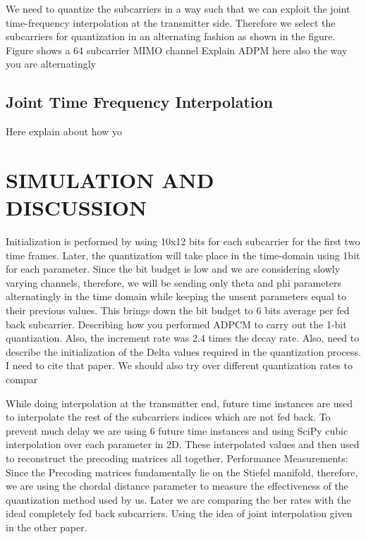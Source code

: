 \documentclass[conference]{IEEEtran}
\begin{document}
We need to quantize the subcarriers in a way such that we can exploit the joint time-frequency interpolation at the transmitter side. Therefore we select the subcarriers for quantization in an alternating fashion as shown in the figure. Figure shows a 64 subcarrier MIMO channel
Explain ADPM here
also the way you are alternatingly
\subsection{Joint Time Frequency Interpolation}
\label{interp}

Here explain about how yo
\section{SIMULATION AND DISCUSSION}
\label{section3}

Initialization is performed by using 10x12 bits for each subcarrier for the first two time frames. Later, the quantization will take place in the time-domain using 1bit for each parameter. Since the bit budget is low and we are considering slowly varying channels, therefore, we will be sending only theta and phi parameters alternatingly in the time domain while keeping the unsent parameters equal to their previous values. This brings down the bit budget to 6 bits average per fed back subcarrier. 
Describing how you performed ADPCM to carry out the 1-bit quantization. Also, the increment rate was 2.4 times the decay rate. Also, need to describe the initialization of the Delta values required in the quantization process. I need to cite that paper. We should also try over different quantization rates to compar \cite{Gupt1905}

While doing interpolation at the transmitter end, future time instances are used to interpolate the rest of the subcarriers indices which are not fed back. To prevent much delay we are using 6 future time instances and using SciPy cubic interpolation over each parameter in 2D. These interpolated values and then used to reconstruct the precoding matrices all together.
Performance Measurements:
Since the Precoding matrices fundamentally lie on the Stiefel manifold, therefore, we are using the chordal distance parameter to measure the effectiveness of the quantization method used by us. Later we are comparing the ber rates with the ideal completely fed back subcarriers.
Using the idea of joint interpolation given in the other paper.  
\end{document}
